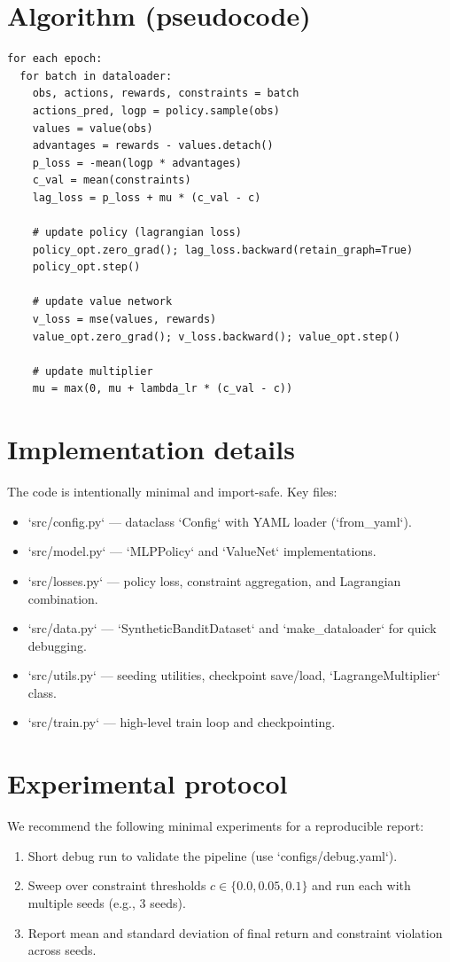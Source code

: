 \section{Algorithm (pseudocode)}
\begin{verbatim}
for each epoch:
  for batch in dataloader:
    obs, actions, rewards, constraints = batch
    actions_pred, logp = policy.sample(obs)
    values = value(obs)
    advantages = rewards - values.detach()
    p_loss = -mean(logp * advantages)
    c_val = mean(constraints)
    lag_loss = p_loss + mu * (c_val - c)

    # update policy (lagrangian loss)
    policy_opt.zero_grad(); lag_loss.backward(retain_graph=True)
    policy_opt.step()

    # update value network
    v_loss = mse(values, rewards)
    value_opt.zero_grad(); v_loss.backward(); value_opt.step()

    # update multiplier
    mu = max(0, mu + lambda_lr * (c_val - c))
\end{verbatim}

\section{Implementation details}
The code is intentionally minimal and import-safe. Key files:
\begin{itemize}
  \item `src/config.py` — dataclass `Config` with YAML loader (`from_yaml`).
  \item `src/model.py` — `MLPPolicy` and `ValueNet` implementations.
  \item `src/losses.py` — policy loss, constraint aggregation, and Lagrangian combination.
  \item `src/data.py` — `SyntheticBanditDataset` and `make_dataloader` for quick debugging.
  \item `src/utils.py` — seeding utilities, checkpoint save/load, `LagrangeMultiplier` class.
  \item `src/train.py` — high-level train loop and checkpointing.
\end{itemize}

\section{Experimental protocol}
We recommend the following minimal experiments for a reproducible report:
\begin{enumerate}
  \item Short debug run to validate the pipeline (use `configs/debug.yaml`).
  \item Sweep over constraint thresholds $c \in \{0.0, 0.05, 0.1\}$ and run each with multiple seeds (e.g., 3 seeds).
  \item Report mean and standard deviation of final return and constraint violation across seeds.
\end{enumerate}

